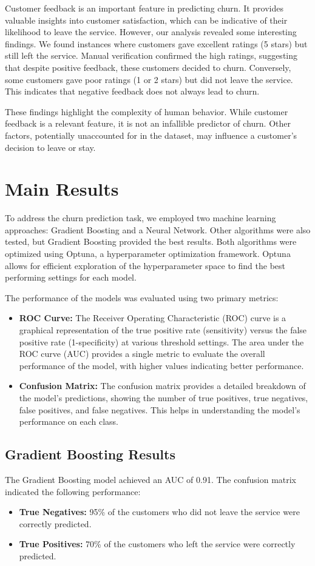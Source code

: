 \documentclass[12pt,titlepage]{article}
\begin{document}
Customer feedback is an important feature in predicting churn. It provides valuable insights into customer satisfaction, which can be indicative of their likelihood to leave the service. However, our analysis revealed some interesting findings. We found instances where customers gave excellent ratings (5 stars) but still left the service. Manual verification confirmed the high ratings, suggesting that despite positive feedback, these customers decided to churn. Conversely, some customers gave poor ratings (1 or 2 stars) but did not leave the service. This indicates that negative feedback does not always lead to churn.

These findings highlight the complexity of human behavior. While customer feedback is a relevant feature, it is not an infallible predictor of churn. Other factors, potentially unaccounted for in the dataset, may influence a customer's decision to leave or stay. 

\section{Main Results}
To address the churn prediction task, we employed two machine learning approaches: Gradient Boosting and a Neural Network. Other algorithms were also tested, but Gradient Boosting provided the best results. Both algorithms were optimized using Optuna, a hyperparameter optimization framework. Optuna allows for efficient exploration of the hyperparameter space to find the best performing settings for each model.

The performance of the models was evaluated using two primary metrics:
\begin{itemize}
    \item \textbf{ROC Curve:} The Receiver Operating Characteristic (ROC) curve is a graphical representation of the true positive rate (sensitivity) versus the false positive rate (1-specificity) at various threshold settings. The area under the ROC curve (AUC) provides a single metric to evaluate the overall performance of the model, with higher values indicating better performance.
    \item \textbf{Confusion Matrix:} The confusion matrix provides a detailed breakdown of the model's predictions, showing the number of true positives, true negatives, false positives, and false negatives. This helps in understanding the model's performance on each class.
\end{itemize}

\subsection{Gradient Boosting Results}
The Gradient Boosting model achieved an AUC of 0.91. The confusion matrix indicated the following performance:
\begin{itemize}
    \item \textbf{True Negatives:} 95\% of the customers who did not leave the service were correctly predicted.
    \item \textbf{True Positives:} 70\% of the customers who left the service were correctly predicted.
\end{itemize}
\end{document}
